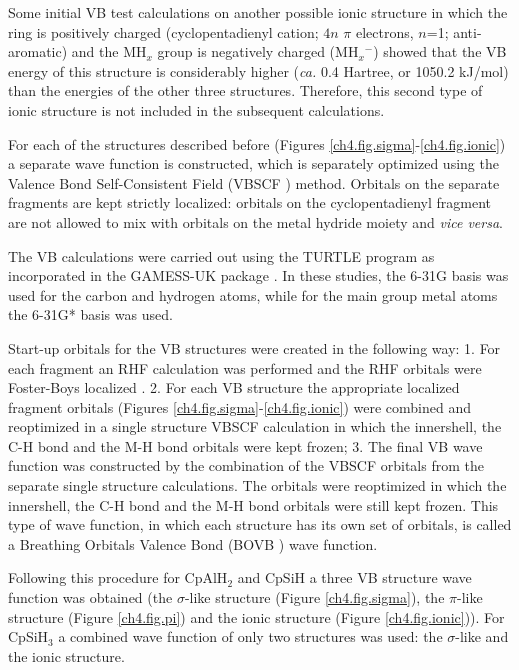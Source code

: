 Some initial VB test calculations on another possible ionic structure in which the ring is positively charged (cyclopentadienyl cation; $4n$ $\pi$ electrons, $n$=1; anti-aromatic) and the MH$_x$ group is negatively charged (MH${_x}{^-}$) showed that the VB energy of this structure is considerably higher (\textit{ca.} 0.4 Hartree, or 1050.2 kJ/mol) than the energies of the other three structures. Therefore, this second type of ionic structure is not included in the subsequent calculations.

For each of the structures described before (Figures \ref{ch4.fig.sigma}-\ref{ch4.fig.ionic}) a separate wave function is constructed, which is separately optimized using the Valence Bond Self-Consistent Field (VBSCF \cite{vbscf1,vbscf2}) method. Orbitals on the separate fragments are kept strictly localized: orbitals on the cyclopentadienyl fragment are not allowed to mix with orbitals on the metal hydride moiety and \textit{vice versa}.

The VB calculations were carried out using the \mbox{TURTLE} program \cite{turtle} as incorporated in the GAMESS-UK package \cite{gamess}. In these studies, the \mbox{6-31G} basis was used for the carbon and hydrogen atoms, while for the main group metal atoms the 6-31G* basis was used. 

Start-up orbitals for the VB structures were created in the following way: 1. For each fragment an RHF calculation was performed and the RHF orbitals were Foster-Boys localized \cite{foster}. 2. For each VB structure the appropriate localized fragment orbitals (Figures \ref{ch4.fig.sigma}-\ref{ch4.fig.ionic}) were combined and reoptimized in a single structure VBSCF calculation in which the innershell, the C-H bond and the M-H bond orbitals were kept frozen; 3. The final VB wave function was constructed by the combination of the VBSCF orbitals from the separate single structure calculations. The orbitals were reoptimized in which the innershell, the C-H bond and the M-H bond orbitals were still kept frozen. This type of wave function, in which each structure has its own set of orbitals, is called a Breathing Orbitals Valence Bond (BOVB \cite{bovb1,bovb2}) wave function. 

Following this procedure  for CpAlH$_2$ and CpSiH a three VB structure wave function was obtained (the $\sigma$-like structure (Figure \ref{ch4.fig.sigma}), the $\pi$-like structure (Figure \ref{ch4.fig.pi}) and the ionic structure (Figure \ref{ch4.fig.ionic})). For CpSiH$_3$ a combined wave function of only two structures was used: the $\sigma$-like and the ionic structure.


